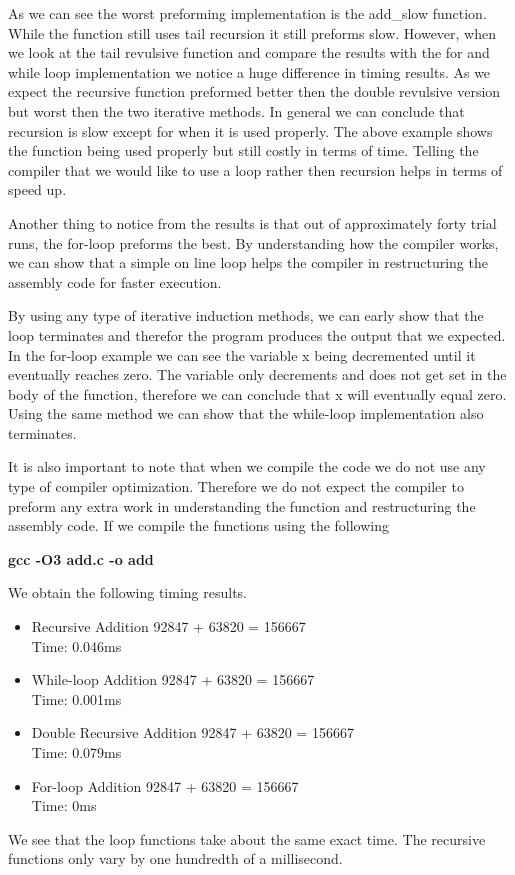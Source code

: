\documentclass{article}
\begin{document}
As we can see the worst preforming implementation is the add\_slow function. While the function still uses tail recursion it still preforms slow. However, when we look at the tail revulsive function and compare the results with the for and while loop implementation we notice a huge difference in timing results. As we expect the recursive function preformed better then the double revulsive version but worst then the two iterative methods. In general we can conclude that recursion is slow except for when it is used properly. The above example shows the function being used properly but still costly in terms of time. Telling the compiler that we would like to use a loop rather then recursion helps in terms of speed up. 

Another thing to notice from the results is that out of approximately forty trial runs, the for-loop preforms the best. By understanding how the compiler works, we can show that a simple on line loop helps the compiler in restructuring the assembly code for faster execution. 

By using any type of iterative induction methods, we can early show that the loop terminates and therefor the program produces the output that we expected. In the for-loop example we can see the variable x being decremented until it eventually reaches zero. The variable only decrements and does not get set in the body of the function, therefore we can conclude that x will eventually equal zero. Using the same method we can show that the while-loop implementation also terminates. 

It is also important to note that when we compile the code we do not use any type of compiler optimization. Therefore we do not expect the compiler to preform any extra work in understanding the function and restructuring the assembly code. If we compile the functions using the following 

\begin{center} \textbf{gcc -O3 add.c -o add}\end{center}

We obtain the following timing results.

\begin{itemize}
\item  Recursive Addition 92847 + 63820 = 156667 \\Time: 0.046ms

\item While-loop Addition 92847 + 63820 = 156667 \\Time: 0.001ms

\item Double Recursive Addition 92847 + 63820 = 156667 \\Time: 0.079ms

\item For-loop Addition 92847 + 63820 = 156667 \\Time: 0ms
\end{itemize}
We see that the loop functions take about the same exact time. The recursive functions only vary by one hundredth of a millisecond. 
 
\end{document}

